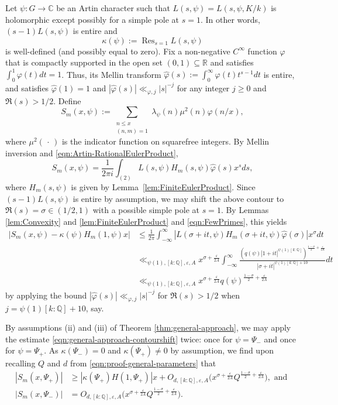 \documentclass[12pt]{amsart}
\theoremstyle{definition} \newtheorem{definition}[theorem]{Definition}
\theoremstyle{example} \newtheorem{example}[theorem]{Example}
\theoremstyle{remark} \newtheorem{remark}{Remark}[theorem]
\numberwithin{equation}{section}
\numberwithin{theorem}{section}
\renewcommand{\epsilon}{\varepsilon}
\renewcommand{\leq}{\leqslant}
\renewcommand{\geq}{\geqslant}
\newcommand{\R}{\mathbb{R}}
\newcommand{\Q}{\mathbb{Q}}
\begin{document}
Let $\psi : G \to \mathbb{C}$ be an Artin character such that $L(s,\psi) = L(s,\psi,K/k)$ is holomorphic except possibly for a simple pole at $s=1$. In other words, $(s-1) L(s,\psi)$ is entire and  
\[
\kappa(\psi) := \mathop{\mathrm{Res}}_{s=1} L(s,\psi)
\]
is well-defined (and possibly equal to zero).    Fix a non-negative $C^{\infty}$ function $\varphi$ that is compactly supported in the open set $(0,1) \subseteq \R$ and satisfies $\int_0^1 \varphi(t) dt = 1$. Thus, its Mellin transform $\widehat{\varphi}(s) := \int_0^{\infty} \varphi(t) t^{s-1} dt$ is entire, and satisfies $\widehat{\varphi}(1) = 1$ and $|\widehat{\varphi}(s)| \ll_{\varphi,j} |s|^{-j}$ for any integer $j \geq 0$ and $\Re(s) > 1/2$. Define
\[
S_m(x,\psi) := \sum_{\substack{n \leq x \\ (n,m)=1}} \lambda_{\psi}(n) \mu^2(n)   \varphi(n/x), 
\]
where $\mu^2(\,\cdot\,)$ is the indicator function on squarefree integers. By Mellin inversion and \eqref{eqn:Artin-RationalEulerProduct}, 
\[
S_m(x,\psi)  = \frac{1}{2\pi i} \int_{(2)} L(s,\psi) H_m(s,\psi) \widehat{\varphi}(s) x^s ds, 
\]
where $H_m(s,\psi)$ is given by Lemma~\ref{lem:FiniteEulerProduct}. 
Since $(s-1)L(s,\psi)$ is entire by assumption, we may shift the above contour to $\Re(s) = \sigma \in (1/2,1)$ with a possible simple pole at $s=1$. By Lemmas \ref{lem:Convexity} and \ref{lem:FiniteEulerProduct} and \eqref{eqn:FewPrimes}, this yields 
\begin{equation} \label{eqn:general-approach-contourshift}
\begin{aligned} 
\Big|S_m(x,\psi)  -  \kappa(\psi)  H_m(1,\psi)  x \Big| 
& \leq \frac{1}{2\pi} \int_{-\infty}^{\infty} |L(\sigma+it,\psi) H_m(\sigma+it,\psi) \widehat{\varphi}(\sigma)| x^{\sigma}   dt \\
& \ll_{\psi(1),[k:\Q],\epsilon,A}   x^{\sigma+ \frac{\epsilon}{2A}}   \int_{-\infty}^{\infty} \frac{ ( q(\psi)   |1+it|^{\psi(1)[k:\Q]} )^{\frac{1-\sigma}{2}+\frac{\epsilon}{2A}}  }{|\sigma+it|^{\psi(1) [k:\Q]+10}}  dt \\
&  \ll_{\psi(1),[k:\Q],\epsilon,A}   x^{\sigma+ \frac{\epsilon}{2A}} q(\psi)^{\frac{1-\sigma}{2} + \frac{\epsilon}{2A}}
\end{aligned}
\end{equation}
by applying the bound $|\widehat{\varphi}(s)| \ll_{\varphi,j} |s|^{-j}$ for $\Re(s) > 1/2$ when $j = \psi(1) [k:\Q]+10$, say.

By assumptions (ii) and (iii) of Theorem \ref{thm:general-approach}, we may apply the estimate \eqref{eqn:general-approach-contourshift} twice: once for $\psi = \Psi_-$ and once for $\psi =\Psi_+$. As $\kappa(\Psi_-) = 0$ and $\kappa(\Psi_+) \neq 0$ by assumption, we find upon recalling $Q$ and $d$ from  \eqref{eqn:proof-general-parameters} that
\begin{align*}
|S_m(x,\Psi_+)| & \geq  |\kappa(\Psi_+) H(1,\Psi_+)|  x + O_{d,[k:\Q],\epsilon,A}\big(x^{\sigma+ \frac{\epsilon}{2A}} Q^{\frac{1-\sigma}{2} + \frac{\epsilon}{2A}} \big) , \text{ and } \\
|S_m(x,\Psi_-)| & =  O_{d,[k:\Q],\epsilon,A}\big(x^{\sigma+ \frac{\epsilon}{2A}} Q^{\frac{1-\sigma}{2} + \frac{\epsilon}{2A}} \big).
\end{align*}
\end{document}
